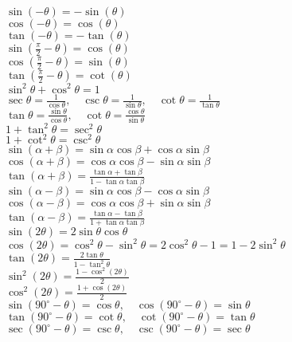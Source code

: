 \documentclass{article}
\begin{document}
$\sin(-\theta) = -\sin(\theta)$\\
$\cos(-\theta) = \cos(\theta)$\\
$\tan(-\theta) = -\tan(\theta)$\\
$\sin(\frac{\pi}{2} - \theta) = \cos(\theta)$\\
$\cos(\frac{\pi}{2} - \theta) = \sin(\theta)$\\
$\tan(\frac{\pi}{2} - \theta) = \cot(\theta)$\\
$\sin^2 \theta + \cos^2 \theta = 1 $\\
$\sec \theta = \frac{1}{\cos \theta}, \quad \csc \theta = \frac{1}{\sin \theta}, \quad \cot \theta = \frac{1}{\tan \theta} $\\
$\tan \theta = \frac{\sin \theta}{\cos \theta}, \quad \cot \theta = \frac{\cos \theta}{\sin \theta} $\\
$1 + \tan^2 \theta = \sec^2 \theta $\\
$1 + \cot^2 \theta = \csc^2 \theta $\\
$\sin(\alpha + \beta) = \sin \alpha \cos \beta + \cos \alpha \sin \beta $\\
$\cos(\alpha + \beta) = \cos \alpha \cos \beta - \sin \alpha \sin \beta $\\
$\tan(\alpha + \beta) = \frac{\tan \alpha + \tan \beta}{1 - \tan \alpha \tan \beta} $\\
$\sin(\alpha - \beta) = \sin \alpha \cos \beta - \cos \alpha \sin \beta $\\
$\cos(\alpha - \beta) = \cos \alpha \cos \beta + \sin \alpha \sin \beta $\\
$\tan(\alpha - \beta) = \frac{\tan \alpha - \tan \beta}{1 + \tan \alpha \tan \beta} $\\
$\sin(2\theta) = 2\sin \theta \cos \theta $\\
$\cos(2\theta) = \cos^2 \theta - \sin^2 \theta = 2\cos^2 \theta - 1 = 1 - 2\sin^2 \theta $\\
$\tan(2\theta) = \frac{2\tan \theta}{1 - \tan^2 \theta} $\\
$\sin^2(2\theta) = \frac{1 - \cos^2(2\theta)}{2} $\\
$\cos^2(2\theta) = \frac{1 + \cos(2\theta)}{2} $\\
$\sin(90^\circ - \theta) = \cos \theta, \quad \cos(90^\circ - \theta) = \sin \theta $\\
$\tan(90^\circ - \theta) = \cot \theta, \quad \cot(90^\circ - \theta) = \tan \theta $\\
$\sec(90^\circ - \theta) = \csc \theta, \quad \csc(90^\circ - \theta) = \sec \theta $\\
\end{document}
